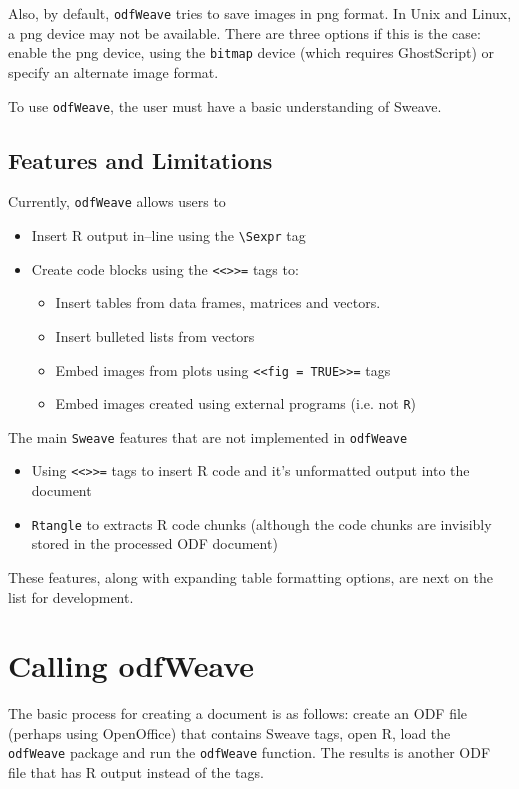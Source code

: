 \documentclass[12pt]{article}
\newcommand{\odfWeave}{{\tt odfWeave}\xspace}
\newcommand{\odfWeaveFunc}{{\tt odfWeave}\xspace}
\begin{document}
Also, by default, \odfWeaveFunc tries to save images in png format. In Unix and Linux, a png device may not be available. There are three options if this is the case: enable the png device, using the \texttt{bitmap} device (which requires GhostScript) or specify an alternate image format.

To use \odfWeave, the user must have a basic understanding of Sweave.
	
\subsection{Features and Limitations}	
	
Currently, \odfWeave allows users to
\begin{itemize}	
\item Insert R output in--line using the \verb+\Sexpr+ tag
\item Create code blocks using the \verb+<<>>=+ tags to:
   \begin{itemize}	
   \item Insert tables from data frames, matrices and vectors.
   \item Insert bulleted lists from vectors
   \item Embed images from plots using  \verb+<<fig = TRUE>>=+ tags
   \item Embed images created using external programs (i.e. not \texttt{R})
   \end{itemize}
\end{itemize}
The main \texttt{Sweave} features that are not implemented in \odfWeave 
\begin{itemize}	
\item Using \verb+<<>>=+ tags to insert R code and it's unformatted output into the document
\item \texttt{Rtangle} to extracts R code chunks (although the code chunks are invisibly stored in the processed ODF document)
\end{itemize}	
These features, along with expanding table formatting options, are next on the list for development.

	
\section{Calling odfWeave}	

The basic process for creating a document is as follows: create an ODF file (perhaps using OpenOffice) that contains Sweave tags, open R, load the \odfWeave  package and run the \odfWeaveFunc function. The results is another ODF file that has R output instead of the tags.
\end{document}
